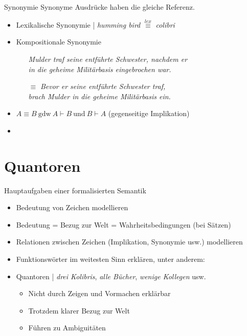 \begin{frame}
  {Synonymie}
  \onslide<+->
  \onslide<+->
  Synonyme Ausdrücke haben  \alert{die gleiche Referenz}.\\
  \Halbzeile
  \begin{itemize}[<+->]
    \item Lexikalische Synonymie | \textit{humming bird} $\stackrel{lex}{\equiv}$ \textit{colibri}
      \Halbzeile
    \item Kompositionale Synonymie
      \begin{itemize}[<+->]
        \item[ ] \textit{Mulder traf seine entführte Schwester, nachdem er\\
          in die geheime Militärbasis eingebrochen war.}
        \item[$\equiv$] \textit{Bevor er seine entführte Schwester traf,\\
          brach Mulder in die geheime Militärbasis ein.}
      \end{itemize}
    \Halbzeile
    \item \alert{$A\equiv B\ \text{gdw}\ A\vdash B\ \text{und}\ B\vdash A$} (gegenseitige Implikation)
    \item {}
  \end{itemize}
\end{frame}


\section{Quantoren}

\begin{frame}
  {Hauptaufgaben einer formalisierten Semantik}
  \onslide<+->
  \begin{itemize}[<+->]
    \item Bedeutung von Zeichen modellieren
    \item Bedeutung = Bezug zur Welt = Wahrheitsbedingungen (bei Sätzen)
    \item Relationen zwischen Zeichen (Implikation, Synonymie usw.) modellieren
      \Halbzeile
    \item \alert{Funktionswörter} im weitesten Sinn erklären, unter anderem:
    \item Quantoren | \textit{drei Kolibris}, \textit{alle Bücher}, \textit{wenige Kollegen} usw.
      \begin{itemize}[<+->]
        \item Nicht durch Zeigen und Vormachen erklärbar
        \item Trotzdem klarer Bezug zur Welt\\
        \item Führen zu \alert{Ambiguitäten}
      \end{itemize}
  \end{itemize}
\end{frame}


